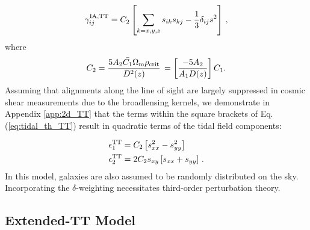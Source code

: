 \begin{eqnarray}
\gamma_{ij}^{\rm IA, TT} = C_2 \left[ \sum_{k=x,y,z} s_{ik} s_{kj} -\frac{1}{3} \delta_{ij} s^2 \right] \, ,
\label{eq:tidal_th_TT}
\end{eqnarray}
where 
\begin{eqnarray}
C_2 = \frac{5 A_2 \bar{C_1} \Omega_{\rm m} \rho_{\rm crit}}{D^2(z)} \,  = \left[ \frac{-5 A_2}{A_1 D(z)} \right] C_1.
\end{eqnarray}
Assuming that alignments along the line of sight are largely suppressed in cosmic shear measurements due to the broadlensing kernels, we demonstrate in Appendix \ref{app:2d_TT} that the terms within the square brackets of Eq. (\ref{eq:tidal_th_TT}) result in quadratic terms of the tidal field components:

\begin{equation}
\begin{split}
\epsilon_1^{\rm TT} &= C_2  \left[ s_{xx}^2 - s_{yy}^2\right] \\
 \epsilon_2^{\rm TT} &= 2 C_2 s_{xy}\left[s_{xx}+s_{yy}  \right]\, .
\end{split}
\end{equation}
In this model, galaxies are also assumed to be randomly distributed on the sky. 
Incorporating the $\delta$-weighting necessitates third-order perturbation theory.



\subsection{Extended-TT Model}
\label{subsec:IA_th_extTT}



